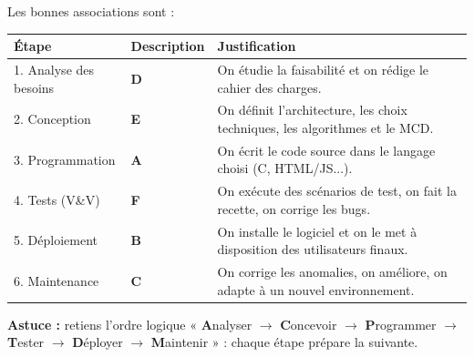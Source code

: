 \documentclass[11pt]{article}
\begin{document}
\begin{corrige}
Les bonnes associations sont :
\begin{center}
\begin{tabularx}{\linewidth}{|l|l|X|}
\hline
\rowcolor{popblueL}
\textbf{Étape} & \textbf{Description} & \textbf{Justification} \\
\hline
1. Analyse des besoins & \textbf{D} & On étudie la faisabilité et on rédige le cahier des charges. \\
\hline
2. Conception & \textbf{E} & On définit l'architecture, les choix techniques, les algorithmes et le MCD. \\
\hline
3. Programmation & \textbf{A} & On écrit le code source dans le langage choisi (C, HTML/JS...). \\
\hline
4. Tests (V\&V) & \textbf{F} & On exécute des scénarios de test, on fait la recette, on corrige les bugs. \\
\hline
5. Déploiement & \textbf{B} & On installe le logiciel et on le met à disposition des utilisateurs finaux. \\
\hline
6. Maintenance & \textbf{C} & On corrige les anomalies, on améliore, on adapte à un nouvel environnement. \\
\hline
\end{tabularx}
\end{center}
\textbf{Astuce :} retiens l'ordre logique « \textbf{A}nalyser $\to$ \textbf{C}oncevoir $\to$ \textbf{P}rogrammer $\to$ \textbf{T}ester $\to$ \textbf{D}éployer $\to$ \textbf{M}aintenir » : chaque étape prépare la suivante.
\end{corrige}
\end{document}
